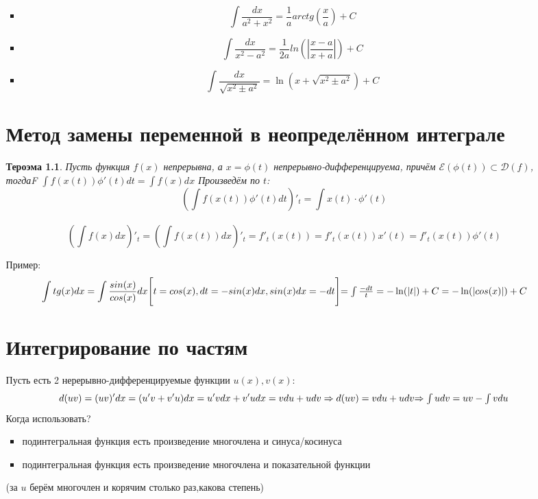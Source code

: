 \documentclass[oneside]{book}
\newtheorem{thm}{Тероэма}[chapter] %
\begin{document}
\begin{itemize}
\begin{enumerate}
\begin{itemize}
\begin{equation}
  \end{equation}
  \item \begin{equation}
    \int \frac{dx}{a^2 + x^2} = \frac{1}{a}arctg(\frac{x}{a}) + C
  \end{equation}
  \item \begin{equation}
    \int \frac{dx}{x^2 - a^2} = \frac{1}{2a}ln(|\frac{x - a}{x + a}|) + C
  \end{equation}
  \item \begin{equation}
    \int \frac{dx}{\sqrt{x^2 \pm a^2}} = \ln(x + \sqrt{x^2 \pm a^2}) + C
  \end{equation}
\end{itemize}
\setcounter{chapter}{32}
\chapter[Замен переменной]{Метод замены переменной в неопределённом интеграле}
\begin{thm}
  Пусть функция $f(x)$ непрерывна, а $x = \phi(t)$ непрерывно-дифференцируема, причём $\mathcal{E}(\phi(t)) \subset \mathcal{D}(f)$, тогдаF
  $\int f(x(t)) \phi'(t) dt = \int f(x) dx$ Произведём по $t$: $$
  (\int f(x(t)) \phi'(t) dt)'_t = \int x(t) \cdot \phi'(t) $$\\$$
  (\int f(x) dx)'_t = (\int f(x(t))dx)'_t = f'_t(x(t)) = f'_t(x(t))x'(t) = f'_t(x(t))\phi'(t)
  $$
\end{thm}
Пример:
\begin{equation}
  \int tg(x)dx = \int \frac{sin(x)}{cos(x)}dx \\
  \Bigg[t = cos(x), dt = -sin(x)dx, sin(x)dx = -dt \Bigg] $$\\$$ =
  \int \frac{-dt}{t} = -\ln(|t|)+C = -\ln(|cos(x)|) + C
\end{equation}
\setcounter{chapter}{33}
\chapter{Интегрирование по частям}
Пусть есть 2 нерерывно-дифференцируемые функции $u(x), v(x)$: \begin{equation}
  d(uv) = (uv)'dx = (u'v + v'u)dx = u'vdx + v'udx = vdu + udv \Rightarrow d(uv) = vdu + udv
  $\\$ \Rightarrow \int udv = uv - \int vdu
\end{equation}
Когда использовать?

\begin{itemize}
  \item подинтегральная функция есть произведение многочлена и синуса/косинуса
  \item подинтегральная функция есть произведение многочлена и показательной функции
\end{itemize}
(за $u$ берём многочлен и корячим столько раз,какова степень)


\end{enumerate}
\end{itemize}
\end{document}
